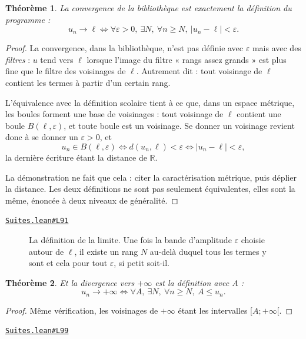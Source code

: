 \documentclass[11pt,a4paper]{article}
\theoremstyle{definition}
\theoremstyle{plain}
\newtheorem{theoreme}{Théorème}
\newcommand{\source}[2]{\par\smallskip\noindent\hfill{\footnotesize\href{#1}{\texttt{#2}}}\par\smallskip}
\begin{document}
\begin{theoreme}
La convergence de la bibliothèque est exactement la définition du programme :
\[ u_n \to \ell \iff \forall \varepsilon > 0,\ \exists N,\ \forall n \ge N,\
   |u_n - \ell| < \varepsilon . \]
\end{theoreme}

\begin{proof}
La convergence, dans la bibliothèque, n'est pas définie avec $\varepsilon$ mais avec des
\emph{filtres} : $u$ tend vers $\ell$ lorsque l'image du filtre « rangs assez grands » est
plus fine que le filtre des voisinages de $\ell$. Autrement dit : tout voisinage de $\ell$
contient les termes à partir d'un certain rang.

L'équivalence avec la définition scolaire tient à ce que, dans un espace métrique, les
boules forment une base de voisinages : tout voisinage de $\ell$ contient une boule
$B(\ell, \varepsilon)$, et toute boule est un voisinage. Se donner un voisinage revient donc
à se donner un $\varepsilon > 0$, et
\[ u_n \in B(\ell, \varepsilon) \iff d(u_n, \ell) < \varepsilon
   \iff |u_n - \ell| < \varepsilon , \]
la dernière écriture étant la distance de $\mathbb{R}$.

La démonstration ne fait que cela : citer la caractérisation métrique, puis déplier la
distance. Les deux définitions ne sont pas seulement équivalentes, elles sont la même,
énoncée à deux niveaux de généralité.
\end{proof}
\source{https://github.com/Commutator-IO/learn-lean/blob/main/courses/02-lycee/03-suites/Suites.lean\#L91}{Suites.lean\#L91}

\begin{figure}[h]
\centering

\caption{La définition de la limite. Une fois la bande d'amplitude $\varepsilon$ choisie autour de $\ell$, il existe un rang $N$ au-delà duquel tous les termes y sont \textemdash{} et cela pour tout $\varepsilon$, si petit soit-il.}
\end{figure}

\begin{theoreme}
Et la divergence vers $+\infty$ est la définition avec $A$ :
\[ u_n \to +\infty \iff \forall A,\ \exists N,\ \forall n \ge N,\ A \le u_n . \]
\end{theoreme}

\begin{proof}
Même vérification, les voisinages de $+\infty$ étant les intervalles $[A ; +\infty[$.
\end{proof}
\source{https://github.com/Commutator-IO/learn-lean/blob/main/courses/02-lycee/03-suites/Suites.lean\#L99}{Suites.lean\#L99}
\end{document}

